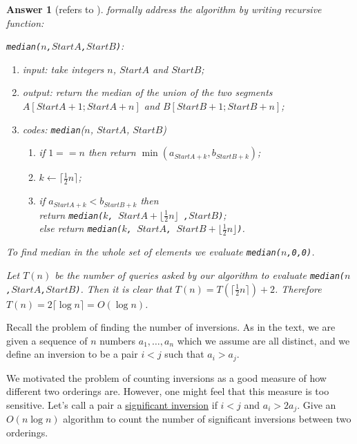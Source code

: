 \documentclass[11pt]{article}
\theoremstyle{numberplain}
\theoremstyle{nonumberplain}
\newtheorem{ans}{Answer}
\def\half{{\frac12}}
\newcommand{\cel}[1]{{\lceil {#1} \rceil}}
\newcommand{\flr}[1]{{\lfloor {#1} \rfloor}}
\newcommand{\0}{{\mathbf{0}}}
\begin{document}
\begin{ans}[refers to \cite{solcornell}]
\cite{solcornell} formally address the algorithm by writing recursive function:\par 
{\tt median($n$,$StartA$,$
StartB$)}:
\begin{enumerate}
\item input: take integers $n$, $StartA$ and $StartB$;\par
\item output: return the median of the union of the two segments $A[StartA+1; StartA+n]$ and
$B[StartB+1; StartB+n]$;
\item codes: {\tt median}($n$, $StartA$, $StartB$)
\begin{code}
\begin{enumerate}   
\item if $1==n$ then return $\min(a_{StartA+k},b_{StartB+k})$;
\item $k\leftarrow \cel{\half n }$;
\item  if $a_{StartA+k}<b_{StartB+k}$ then \\
return {\tt median($k$, $StartA+\flr{\half n }$ ,$StartB$)};\\
     else return {\tt median($k$, $StartA$, $StartB+\flr{\half n }$)}.
\end{enumerate}
\end{code}
\end{enumerate}

To find median in the whole set of elements we evaluate
{\tt median($n$,0,0)}.

Let $T(n)$ be the number of queries asked by our algorithm to evaluate
{\tt median($n$,$StartA$,$StartB$)}.
Then it is clear that $T(n)=T(\cel{\half n })+2$.
Therefore $T(n)=2\cel{\log n}=O(\log n)$.
\end{ans}
\begin{ques}[HW3,5-2] Recall the problem of finding the number of inversions. As in the text, we are given a sequence of $n$ numbers $a_1,\ldots,a_n$ which we assume are all distinct, and we define an inversion to be a pair $i<j$ such that $a_i>a_j$.\par 
We motivated the problem of counting inversions as a good measure of how different two orderings are. However, one might feel that this measure is too sensitive. Let's call a pair a \underline{significant inversion} if $i<j$ and $a_i>2a_j$. Give an $O(n\log n)$ algorithm to count the number of significant inversions between two orderings.
\end{ques}
\end{document}
